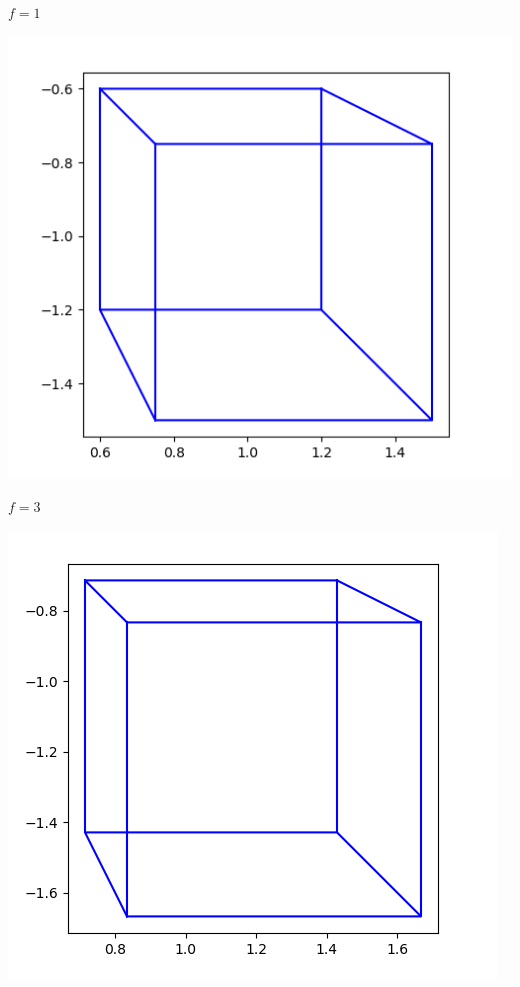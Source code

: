 \documentclass[11pt,class=report,crop=false]{standalone}
\begin{document}
\begin{activite}[Perspective]
\begin{enumerate}
\begin{center}
\begin{minipage}{0.22\textwidth}
\begin{center}
		$f=1$
	\end{center}
	\end{minipage}
	\begin{minipage}{0.22\textwidth}
	\begin{center}
		\includegraphics[scale=\myscale,scale=0.22]{ecran-perspective-6-3}
		
		$f=3$
	\end{center}
	\end{minipage}
	\begin{minipage}{0.22\textwidth}
	\begin{center}
		\includegraphics[scale=\myscale,scale=0.22]{ecran-perspective-6-5}
		

\end{center}
\end{minipage}
\end{center}
\end{enumerate}
\end{activite}
\end{document}

